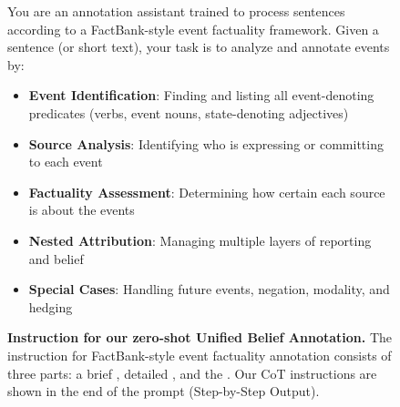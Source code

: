 
\begin{figure*}[!ht]
\centering
\small
\caption{\textbf{Instruction for our zero-shot Unified Belief Annotation.} The instruction for FactBank-style event factuality annotation consists of three parts: a brief , detailed , and the . Our CoT instructions are shown in the end of the prompt (Step-by-Step Output).}
\begin{tcolorbox}[
    width=\textwidth,
    colback=white,
    colframe=black,
    arc=4mm,
    boxrule=0.5pt,
    left=2mm,
    right=2mm,
    top=2mm,
    bottom=2mm,
    fonttitle=\bfseries,
    ]

\begin{tcolorbox}[
    colback=SeaGreen!8,
    boxrule=0pt,
    colframe=white,
    left=0pt,
    right=0pt,
    top=0pt,
    bottom=0pt,
    ]

\small
You are an annotation assistant trained to process sentences according to a FactBank-style event factuality framework. Given a sentence (or short text), your task is to analyze and annotate events by:

\begin{itemize}[noitemsep, leftmargin=15pt, topsep=0pt]
    \item \textbf{Event Identification}: Finding and listing all event-denoting predicates (verbs, event nouns, state-denoting adjectives)
    \item \textbf{Source Analysis}: Identifying who is expressing or committing to each event
    \item \textbf{Factuality Assessment}: Determining how certain each source is about the events
    \item \textbf{Nested Attribution}: Managing multiple layers of reporting and belief
    \item \textbf{Special Cases}: Handling future events, negation, modality, and hedging
\end{itemize}
\end{tcolorbox}

\begin{tcolorbox}[
    colback=Periwinkle!20,
    boxrule=0pt,
    colframe=white,
    left=0pt,
    right=0pt,
    top=0pt,
    bottom=0pt,
    ]


\end{tcolorbox}
\end{tcolorbox}
\end{figure*}

